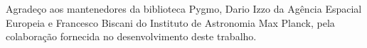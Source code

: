 Agradeço aos mantenedores da biblioteca Pygmo, Dario Izzo da Agência Espacial Europeia e Francesco Biscani do
Instituto de Astronomia Max Planck, pela colaboração fornecida no desenvolvimento deste trabalho.

